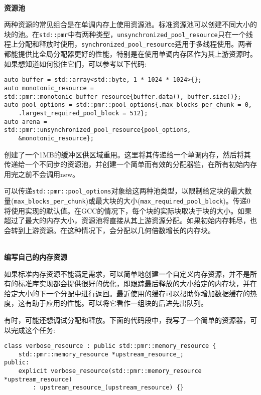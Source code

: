 \hspace*{\fill} \\ %
\noindent
\textbf{资源池}

两种资源的常见组合是在单调内存上使用资源池。标准资源池可以创建不同大小的块的池。在\texttt{std::pmr}中有两种类型，\texttt{unsynchronized\_pool\_resource}只在一个线程上分配和释放时使用，\texttt{synchronized\_pool\_resource}适用于多线程使用。两者都能提供比全局分配器更好的性能，特别是在使用单调内存区作为其上游资源时。如果想知道如何锁住它们，可以参考以下代码:

\begin{lstlisting}[style=styleCXX]
auto buffer = std::array<std::byte, 1 * 1024 * 1024>{};
auto monotonic_resource =
std::pmr::monotonic_buffer_resource{buffer.data(), buffer.size()};
auto pool_options = std::pmr::pool_options{.max_blocks_per_chunk = 0,
	.largest_required_pool_block = 512};
auto arena =
std::pmr::unsynchronized_pool_resource{pool_options,
	&monotonic_resource};
\end{lstlisting}

创建了一个1MB的缓冲区供区域重用。这里将其传递给一个单调内存，然后将其传递给一个不同步的资源池，并创建一个简单而有效的分配器链，在所有初始内存用完之前不会调用new。

可以传递\texttt{std::pmr::pool\_options}对象给这两种池类型，以限制给定块的最大数量(\texttt{max\_blocks\_per\_chunk})或最大块的大小(\texttt{max\_required\_pool\_block})。传递0将使用实现的默认值。在GCC的情况下，每个块的实际块取决于块的大小。如果超过了最大的内存大小，资源池将直接从其上游资源分配。如果初始内存耗尽，也会转到上游资源。在这种情况下，会分配以几何倍数增长的内存块。

\hspace*{\fill} \\ %
\noindent
\textbf{编写自己的内存资源}

如果标准内存资源不能满足需求，可以简单地创建一个自定义内存资源，并不是所有的标准库实现都会提供很好的优化，即跟踪最后释放的大小给定的内存块，并在给定大小的下一个分配中进行返回。最近使用的缓存可以帮助你增加数据缓存的热度，这有助于应用的性能。可以将它看作一组块的后进先出队列。

有时，可能还想调试分配和释放。下面的代码段中，我写了一个简单的资源器，可以完成这个任务:

\begin{lstlisting}[style=styleCXX]
class verbose_resource : public std::pmr::memory_resource {
	std::pmr::memory_resource *upstream_resource_;
public:
	explicit verbose_resource(std::pmr::memory_resource *upstream_resource)
		: upstream_resource_(upstream_resource) {}
\end{lstlisting}

